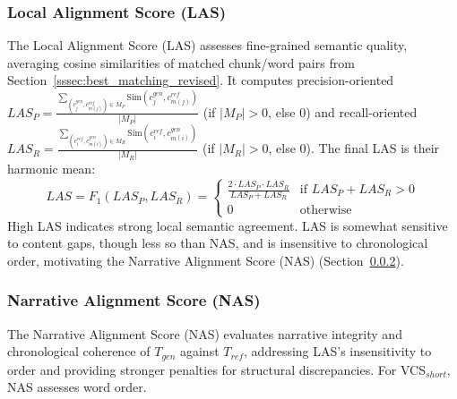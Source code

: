\documentclass[letterpaper]{article} %
\begin{document}
\subsubsection{Local Alignment Score (LAS)}
\label{ssec:las_revised}
The Local Alignment Score (LAS) assesses fine-grained semantic quality, averaging cosine similarities of matched chunk/word pairs from Section~\ref{sssec:best_matching_revised}. It computes precision-oriented $LAS_P = \frac{\sum_{(c_{j}^{gen},c_{m(j)}^{ref})\in M_P}\text{Sim}(c_{j}^{gen},c_{m(j)}^{ref})}{|M_P|}$ (if $|M_P|>0$, else 0) and recall-oriented $LAS_R = \frac{\sum_{(c_{i}^{ref},c_{m(i)}^{gen})\in M_R}\text{Sim}(c_{i}^{ref},c_{m(i)}^{gen})}{|M_R|}$ (if $|M_R|>0$, else 0). The final LAS is their harmonic mean:
\begin{equation}
\label{eq:las_revised}
LAS = F_1(LAS_P, LAS_R) =
\begin{cases}
\frac{2 \cdot LAS_P \cdot LAS_R}{LAS_P + LAS_R} & \text{if } LAS_P + LAS_R > 0 \\
0 & \text{otherwise}
\end{cases}
\end{equation}
High LAS indicates strong local semantic agreement. LAS is somewhat sensitive to content gaps, though less so than NAS, and is insensitive to chronological order, motivating the Narrative Alignment Score (NAS) (Section~\ref{ssec:nas_revised}).

\subsubsection{Narrative Alignment Score (NAS)}
\label{ssec:nas_revised}
The Narrative Alignment Score (NAS) evaluates narrative integrity and chronological coherence of $T_{gen}$ against $T_{ref}$, addressing LAS's insensitivity to order and providing stronger penalties for structural discrepancies. For VCS$_{short}$, NAS assesses word order.
\end{document}
